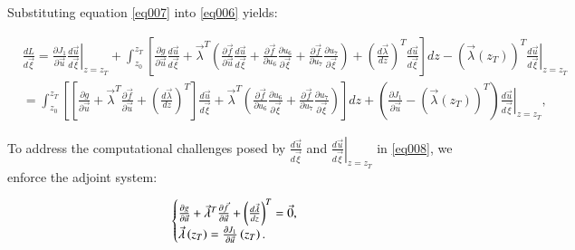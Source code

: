 \documentclass[11pt]{article}
\begin{document}
Substituting equation \eqref{eq007} into \eqref{eq006} yields:

\begin{equation}
	\begin{split}
		& \frac{{dL}}{{d\vec \xi }} = {\left. {\frac{{\partial {J_1}}}{{\partial \vec u}}\frac{{d\vec u}}{{d\vec \xi }}} \right|_{z = {z_T}}} + \int_{{z_0}}^{{z_T}} {\left[ {\frac{{\partial g}}{{\partial \vec u}}\frac{{d\vec u}}{{d\vec \xi }} + {{\vec \lambda }^T}\left( {\frac{{\partial \vec f}}{{\partial \vec u}}\frac{{d\vec u}}{{d\vec \xi }} + \frac{{\partial \vec f}}{{\partial {u_6}}}\frac{{\partial {u_6}}}{{\partial \vec \xi }} + \frac{{\partial \vec f}}{{\partial {u_7}}}\frac{{\partial {u_7}}}{{\partial \vec \xi }}} \right) + {{\left( {\frac{{d\vec \lambda }}{{dz}}} \right)}^T}\frac{{d\vec u}}{{d\vec \xi }}} \right]dz}  - {\left( {\vec \lambda \left( {{z_T}} \right)} \right)^T}{\left. {\frac{{d\vec u}}{{d\vec \xi }}} \right|_{z = {z_T}}}\\
		& = \int_{{z_0}}^{{z_T}} {\left[ {\left[ {\frac{{\partial g}}{{\partial \vec u}} + {{\vec \lambda }^T}\frac{{\partial \vec f}}{{\partial \vec u}} + {{\left( {\frac{{d\vec \lambda }}{{dz}}} \right)}^T}} \right]\frac{{d\vec u}}{{d\vec \xi }} + {{\vec \lambda }^T}\left( {\frac{{\partial \vec f}}{{\partial {u_6}}}\frac{{\partial {u_6}}}{{\partial \vec \xi }} + \frac{{\partial \vec f}}{{\partial {u_7}}}\frac{{\partial {u_7}}}{{\partial \vec \xi }}} \right)} \right]dz}  + \left( {\frac{{\partial {J_1}}}{{\partial \vec u}} - {{\left( {\vec \lambda \left( {{z_T}} \right)} \right)}^T}} \right){\left. {\frac{{d\vec u}}{{d\vec \xi }}} \right|_{z = {z_T}}},
	\end{split}
	\label{eq008}
\end{equation}

To address the computational challenges posed by $\frac{{d\vec u}}{{d\vec \xi }}$ and ${\left. {\frac{{d\vec u}}{{d\vec \xi }}} \right|_{z = {z_T}}}$ in \eqref{eq008}, we enforce the adjoint system:

\begin{equation}
	\left\{ \begin{matrix} 
		\frac{{\partial g}}{{\partial \vec u}} + {{\vec \lambda }^T}\frac{{\partial \vec f}}{{\partial \vec u}} + {\left( {\frac{{d\vec \lambda }}{{dz}}} \right)^T} = \vec 0 , \hfill \cr 
		\vec \lambda \left( {{z_T}} \right) = {\frac{{\partial {J_1}}}{{\partial \vec u}}} \left( {{z_T}} \right) . \hfill \cr 
	\end{matrix}  \right.
\end{equation}
\end{document}
